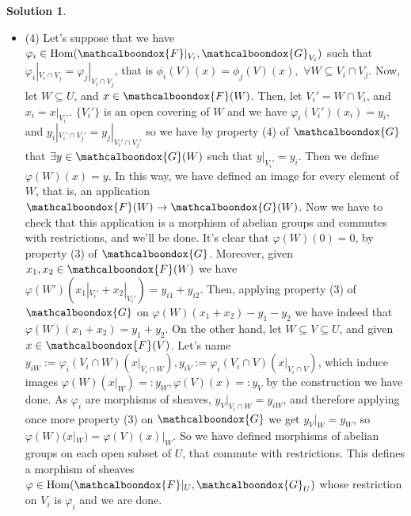 \documentclass[12pt]{article}
\theoremstyle{definition}
\newtheorem*{sol}{Solution}
\newcommand{\sF}{\ensuremath{\mathcalboondox{F}}}
\newcommand{\sG}{\ensuremath{\mathcalboondox{G}}}
\begin{document}
\begin{sol}
\begin{itemize}
		\item (4) Let's suppose that we have $\varphi_i \in \mathrm{Hom}(\sF|_{V_i}, \sG_{V_i})$ such that $\varphi_i|_{V_i \cap V_j} = \varphi_j|_{V_i \cap V_j}$, that is $\phi_i(V)(x) = \phi_j(V)(x), \, \, \forall W \subseteq V_i \cap V_j$. Now, let $W \subseteq U$, and $x \in \sF(W)$. Then, let $V_i' = W \cap V_i$, and $x_i = x|_{V_i'}$. $\{V_i'\}$ is an open covering of $W$ and we have $\varphi_i(V_i')(x_i) = y_i$, and $y_i|_{V_i'\cap V_j'} = y_j|_{V_i' \cap V_j'}$ so we have by property (4) of $\sG$ that $\exists y \in \sG(W)$ such that $y|_{V_i'} = y_i$. Then we define $\varphi(W)(x) = y$. In this way, we have defined an image for every element of $W$, that is, an application $\sF(W) \to \sG(W)$. Now we have to check that this application is a morphism of abelian groups and commutes with restrictions, and we'll be done. It's clear that $\varphi(W)(0) = 0$, by property (3) of $\sG$. Moreover, given $x_1, x_2 \in \sF(W)$ we have $\varphi(W')(x_1|_{V_i'} + x_2|_{V_i'}) = y_{i1} + y_{i2}$. Then, applying property (3) of $\sG$ on $\varphi(W)(x_1+x_2)-y_1-y_2$ we have indeed that $\varphi(W)(x_1+x_2) = y_1 + y_2$. On the other hand, let $W \subseteq V \subseteq U$, and given $x \in \sF(V)$. Let's name $y_{iW} := \varphi_i(V_i \cap W)(x|_{V_i \cap W}), y_{iV} := \varphi_i(V_i \cap V)(x|_{V_i \cap V})$, which induce images $\varphi(W)(x|_W) =: y_W, \varphi(V)(x) =: y_V$ by the construction we have done. As $\varphi_i$ are morphisms of sheaves, $y_V|_{V_i \cap W} = y_{iW}$, and therefore applying once more property (3) on $\sG$ we get $y_V|_{W} = y_W$, so $\varphi(W)(x|_W) = \varphi(V)(x)|_W$. So we have defined morphisms of abelian groups on each open subset of $U$, that commute with restrictions. This defines a morphism of sheaves $\varphi \in \mathrm{Hom}(\sF|_{U}, \sG_{U})$ whose restriction on $V_i$ is $\varphi_i$ and we are done.
	\end{itemize}
\end{sol}
\end{document}
